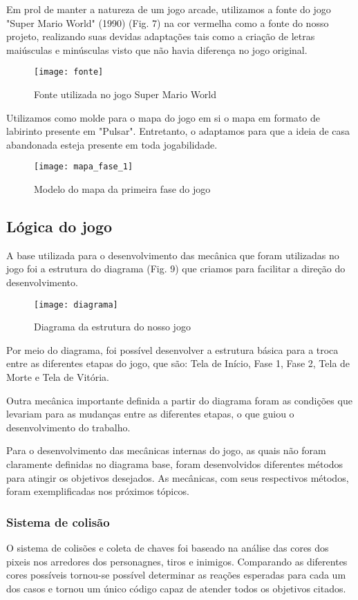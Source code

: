 \documentclass[conference]{IEEEtran}
\begin{document}
Em prol de manter a natureza de um jogo arcade, utilizamos a fonte do jogo "Super Mario World" (1990) (Fig. 7) na cor vermelha como a fonte do nosso projeto, realizando suas devidas adaptações tais como a criação de letras maiúsculas e minúsculas visto que não havia diferença no jogo original. 

\begin{figure}[H]
\centering
\texttt{[image: fonte]}
\caption{Fonte utilizada no jogo Super Mario World}
\end{figure} 

Utilizamos como molde para o mapa do jogo em si o mapa em formato de labirinto presente em "Pulsar". Entretanto, o adaptamos para que a ideia de casa abandonada esteja presente em toda jogabilidade.

\begin{figure}[H]
\centering
\texttt{[image: mapa\_fase\_1]}
\caption{Modelo do mapa da primeira fase do jogo}
\end{figure}  

\subsection{Lógica do jogo}

A base utilizada para o desenvolvimento das mecânica que foram utilizadas no jogo foi a estrutura do diagrama (Fig. 9) que criamos para facilitar a direção do desenvolvimento.

\begin{figure}[h]
\centering
\texttt{[image: diagrama]}
\caption{Diagrama da estrutura do nosso jogo}
\end{figure}

Por meio do diagrama, foi possível desenvolver a estrutura básica para a troca entre as diferentes etapas do jogo, que são: Tela de Início, Fase 1, Fase 2, Tela de Morte e Tela de Vitória.

Outra mecânica importante definida a partir do diagrama foram as condições que levariam para as mudanças entre as diferentes etapas, o que guiou o desenvolvimento do trabalho.

Para o desenvolvimento das mecânicas internas do jogo, as quais não foram claramente definidas no diagrama base, foram desenvolvidos diferentes métodos para atingir os objetivos desejados. As mecânicas, com seus respectivos métodos, foram exemplificadas nos próximos tópicos.

\subsubsection{Sistema de colisão}
 O sistema de colisões e coleta de chaves foi baseado na análise das cores dos pixeis nos arredores dos personagnes, tiros e inimigos. Comparando as diferentes cores possíveis tornou-se possível determinar as reações esperadas para cada um dos casos e tornou um único código capaz de atender todos os objetivos citados.
\end{document}
